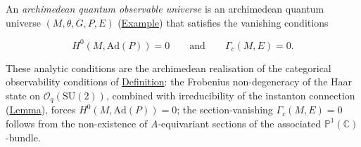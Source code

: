 \begin{example}
  \label{ex:c-quantum-observable-universe}
An \emph{archimedean quantum observable universe} is an archimedean quantum
universe $(M, \theta, G, P, E)$
(\hyperref[def:c-quantum-universe]{Example}) that satisfies
the vanishing conditions

\[
H^0(M, \mathrm{Ad}(P)) = 0
  \qquad\text{and}\qquad
  \Gamma_c(M, E) = 0.
\]

These analytic conditions are the archimedean realisation of the
categorical observability conditions of
\hyperref[def:quantum-observable-universe]{Definition}: the Frobenius
non-degeneracy of the Haar state on $\mathcal{O}_q(\mathrm{SU}(2))$,
combined with irreducibility of the instanton connection
(\hyperref[lem:irreducible-connection]{Lemma}), forces
$H^0(M, \mathrm{Ad}(P)) = 0$; the section-vanishing
$\Gamma_c(M, E) = 0$ follows from the non-existence of
$A$-equivariant sections of the associated $\mathbb{P}^1(\mathbb{C})$-bundle.
\end{example}

